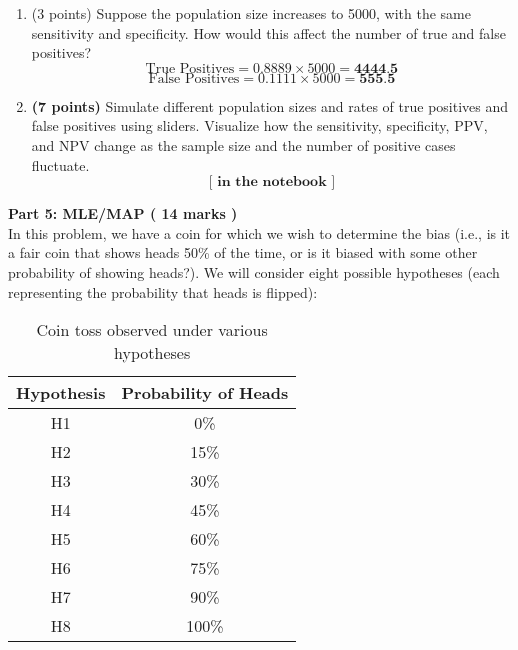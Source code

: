 \documentclass[a3paper,12pt]{extarticle} %
\begin{document}
\begin{enumerate}
        \item (3 points) Suppose the population size increases to 5000, with the same sensitivity and specificity.
        How would this affect the number of true and false positives?
        \[
        \text{True Positives} = 0.8889 \times 5000 = \textbf{4444.5}
        \]
        \[
        \text{False Positives} = 0.1111 \times 5000 = \textbf{555.5}
        \]
        \item \textbf{(7 points)} Simulate different population sizes and rates of true positives and false positives using
        sliders. Visualize how the sensitivity, specificity, PPV, and NPV change as the sample size and the
        number of positive cases fluctuate.
        \[
        \textbf{[ in the notebook ]}
        \]
    \end{enumerate}
    \subitem \textbf{Part 5: MLE/MAP ( 14 marks )}
    \\ In this problem, we have a coin for which we wish to determine the bias (i.e., is it a fair coin that shows
    heads 50\% of the time, or is it biased with some other probability of showing heads?). We will consider
    eight possible hypotheses (each representing the probability that heads is flipped):
    \begin{table}[h!]
        \centering
        \begin{tabular}{|c|c|}
            \hline
            \textbf{Hypothesis} & \textbf{Probability of Heads} \\
            \hline
            H1 & 0\% \\
            \hline
            H2 & 15\% \\
            \hline
            H3 & 30\% \\
            \hline
            H4 & 45\% \\
            \hline
            H5 & 60\% \\
            \hline
            H6 & 75\% \\
            \hline
            H7 & 90\% \\
            \hline
            H8 & 100\% \\
            \hline
        \end{tabular}
        \caption{Coin toss observed under various hypotheses}
        \label{tab:coin_toss_hypotheses}
    \end{table}
\end{document}
